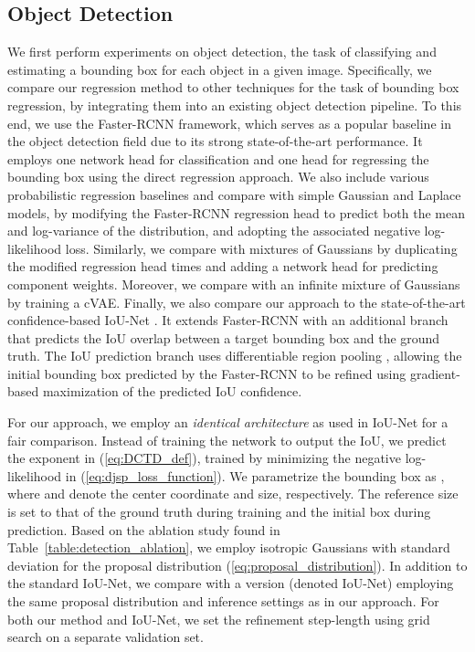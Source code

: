 \documentclass[runningheads]{llncs}
\begin{document}
\subsection{Object Detection}
\label{experiments:object_detection}
We first perform experiments on object detection, the task of classifying and estimating a bounding box for each object in a given image. Specifically, we compare our regression method to other techniques for the task of bounding box regression, by integrating them  into an existing object detection pipeline. To this end, we use the Faster-RCNN \cite{Ren2015FasterRT} framework, which serves as a popular baseline in the object detection field due to its strong state-of-the-art performance. It employs one network head for classification and one head for regressing the bounding box using the direct regression approach. We also include various probabilistic regression baselines and compare with simple Gaussian and Laplace models, by modifying the Faster-RCNN regression head to predict both the mean and log-variance of the distribution, and adopting the associated negative log-likelihood loss. Similarly, we compare with mixtures of  Gaussians by duplicating the modified regression head  times and adding a network head for predicting  component weights. Moreover, we compare with an infinite mixture of Gaussians by training a cVAE. Finally, we also compare our approach to the state-of-the-art confidence-based IoU-Net \cite{jiang2018acquisition}. It extends Faster-RCNN with an additional branch that predicts the IoU overlap between a target bounding box  and the ground truth. The IoU prediction branch uses differentiable region pooling \cite{jiang2018acquisition}, allowing the initial bounding box predicted by the Faster-RCNN to be refined using gradient-based maximization of the predicted IoU confidence. 

For our approach, we employ an \emph{identical architecture} as used in IoU-Net for a fair comparison. Instead of training the network to output the IoU, we predict the exponent  in (\ref{eq:DCTD_def}), trained by minimizing the negative log-likelihood in (\ref{eq:djsp_loss_function}). We parametrize the bounding box as , where  and  denote the center coordinate and size, respectively. The reference size  is set to that of the ground truth during training and the initial box during prediction. Based on the ablation study found in Table~\ref{table:detection_ablation}, we employ  isotropic Gaussians with standard deviation  for the proposal distribution (\ref{eq:proposal_distribution}). In addition to the standard IoU-Net, we compare with a version (denoted IoU-Net) employing the same proposal distribution and inference settings as in our approach. For both our method and IoU-Net, we set the refinement step-length  using grid search on a separate validation set.
\end{document}

